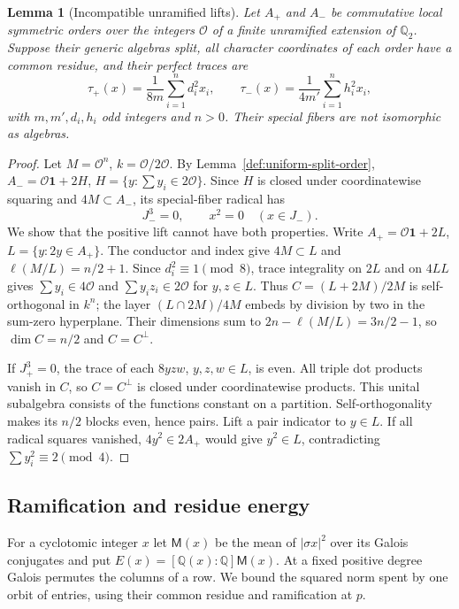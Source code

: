 \documentclass[11pt,a4paper]{article}
\numberwithin{equation}{section}
\newtheorem{lemma}[theorem]{Lemma}
\theoremstyle{remark}
\newcommand{\QQ}{\mathbb Q}
\newcommand{\OO}{\mathcal O}
\begin{document}
\begin{lemma}[Incompatible unramified lifts]\label{fam:M:5.2}
\label{lem:unramified-three-two-obstruction}
Let $A_+$ and $A_-$ be commutative local symmetric orders over the
integers $\mathcal O$ of a finite unramified extension of $\mathbb Q_2$.
Suppose their generic algebras split, all character coordinates of
each order have a common residue, and their perfect traces are
\[
 \tau_+(x)=\frac1{8m}\sum_{i=1}^n d_i^2x_i,
 \qquad \tau_-(x)=\frac1{4m'}\sum_{i=1}^n h_i^2x_i,
\]
with $m,m',d_i,h_i$ odd integers and $n>0$.
Their special fibers are not isomorphic as algebras.
\end{lemma}
\begin{proof}

Let $M=\OO^n$, $k=\OO/2\OO$. By Lemma~\ref{def:uniform-split-order},
$A_-=\OO\mathbf1+2H$, $H=\{y:\sum y_i\in2\OO\}$. Since $H$ is
closed under coordinatewise squaring and $4M\subset A_-$, its special-fiber radical
has
\begin{equation}\label{eq:signed-radical-products}
 J_-^3=0,\qquad x^2=0\quad(x\in J_-).
\end{equation}
We show that the positive lift cannot have both properties.
Write $A_+=\OO\mathbf1+2L$, $L=\{y:2y\in A_+\}$.
The conductor and index give $4M\subset L$ and
$\ell(M/L)=n/2+1$. Since $d_i^2\equiv1\pmod 8$, trace
integrality on $2L$ and on $4LL$ gives $\sum y_i\in4\OO$ and
$\sum y_iz_i\in2\OO$ for $y,z\in L$.
Thus $C=(L+2M)/2M$ is self-orthogonal in $k^n$; the layer
$(L\cap2M)/4M$ embeds by division by two in the sum-zero hyperplane.
Their dimensions sum to $2n-\ell(M/L)=3n/2-1$, so $\dim C=n/2$
and $C=C^\perp$.

If $J_+^3=0$, the trace of each $8yzw$, $y,z,w\in L$, is even.
All triple dot products vanish in $C$, so $C=C^\perp$ is closed
under coordinatewise products. This unital subalgebra consists of the
functions constant on a partition. Self-orthogonality makes its
$n/2$ blocks even, hence pairs. Lift a pair indicator to $y\in L$.
If all radical squares vanished, $4y^2\in2A_+$ would give
$y^2\in L$, contradicting $\sum y_i^2\equiv2\pmod4$.
\end{proof}

\subsection{Ramification and residue energy}\label{fam:M:sec:5.2}

For a cyclotomic integer $x$ let $\mathsf M(x)$ be the mean of
$|\sigma x|^2$ over its Galois conjugates and put
$E(x)=[\QQ(x):\QQ]\mathsf M(x)$. At a fixed positive degree Galois permutes the columns of a row.
We bound the squared norm spent by one orbit of entries, using
their common residue and ramification at $p$.
\end{document}
